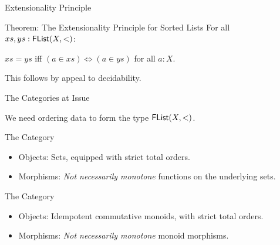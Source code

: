 \documentclass{beamer}
\newcommand{\union}{\AgdaFunction{$\cup$}}
\begin{document}
\begin{frame}{Extensionality Principle}

\begin{block}{Theorem: The Extensionality Principle for Sorted Lists}
  For all $xs, ys : \AgdaDatatype{FList}(X,<)$:

  \begin{center}
    $xs = ys$ iff $(a \in xs) \iff (a \in ys)$ for all $a : X$.
  \end{center}
\end{block}

This follows by appeal to decidability.
\end{frame}


\begin{frame}{The Categories at Issue}
\begin{center}
  We need ordering data to form the type $\AgdaDatatype{FList}(X,<)$.
\end{center}

\begin{block}{The Category }
\begin{itemize}
  \item Objects: Sets, equipped with strict total orders.
  \item Morphisms: \emph{Not necessarily monotone} functions on the underlying sets.
\end{itemize}
\end{block}

\begin{block}{The Category }
\begin{itemize}
  \item Objects: Idempotent commutative monoids, with strict total orders.
  \item Morphisms: \emph{Not necessarily monotone} monoid morphisms.
\end{itemize}
\end{block}
\end{frame}
\end{document}
